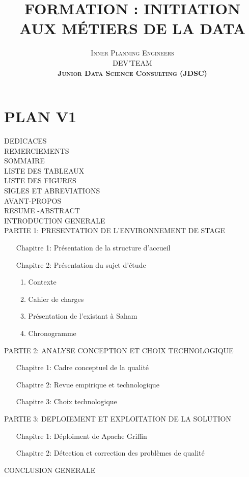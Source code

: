 \documentclass[12pt,a4paper, fleqn]{report}
\title{\Large{FORMATION : INITIATION AUX M\'ETIERS DE LA DATA}}
\author{\textsc{Inner Planning Engineers} 
 \vspace*{1cm} 

{\textsc{DEV'TEAM}} \\  \textbf{\textsc{Junior Data Science Consulting (JDSC)}} \\ \vspace*{1cm} 
    
 }
\date{}
\begin{document}
\ClearShipoutPicture
\chapter*{PLAN V1}

DEDICACES\\
REMERCIEMENTS\\
SOMMAIRE\\
LISTE DES TABLEAUX\\
LISTE DES FIGURES\\
SIGLES ET ABREVIATIONS\\
AVANT-PROPOS\\
RESUME -ABSTRACT\\
INTRODUCTION GENERALE\\
PARTIE 1: PRESENTATION DE L'ENVIRONNEMENT DE STAGE 
\begin{itemize}
\begin{itemize}
\begin{itemize}
\item[Chapitre 1:] Pr\'esentation de la structure d'accueil
\item[Chapitre 2:] Pr\'esentation du sujet d'\'etude
\begin{enumerate}
\item Contexte
\item Cahier de charges
\item Pr\'esentation de l'existant \`a Saham
\item Chronogramme
\end{enumerate}
\end{itemize}
\end{itemize}
\end{itemize}
PARTIE 2: ANALYSE CONCEPTION ET CHOIX TECHNOLOGIQUE
\begin{itemize}
\begin{itemize}
\begin{itemize}
\item[Chapitre 1:] Cadre conceptuel de la qualit\'e
\item[Chapitre 2:] Revue empirique et technologique
\item[Chapitre 3:] Choix technologique
\end{itemize}
\end{itemize}
\end{itemize}
PARTIE 3: DEPLOIEMENT ET EXPLOITATION DE LA SOLUTION
\begin{itemize}
\begin{itemize}
\begin{itemize}
\item[Chapitre 1:] D\'eploiment de Apache Griffin
\item[Chapitre 2:] D\'etection et correction des probl\`emes de qualit\'e
\end{itemize}
\end{itemize}
\end{itemize}
CONCLUSION GENERALE
\end{document}
